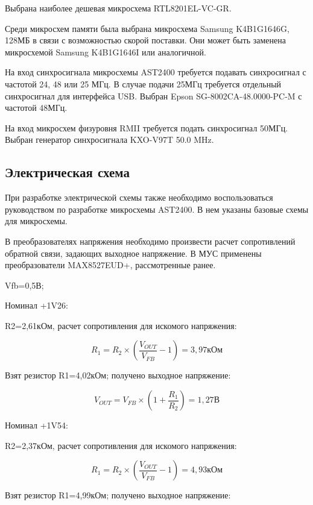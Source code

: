 Выбрана наиболее дешевая микросхема RTL8201EL-VC-GR. 

Среди микросхем памяти была выбрана микросхема Samsung K4B1G1646G, 128МБ в связи с возможностью скорой поставки. Они может быть заменена микросхемой Samsung K4B1G1646I или аналогичной.

На вход синхросигнала микросхемы AST2400 требуется подавать синхросигнал с частотой 24, 48 или 25 МГц. В случае подачи 25МГц требуется отдельный синхросигнал для интерфейса USB. Выбран Epson SG-8002CA-48.0000-PC-M с частотой 48МГц.

На вход микросхем физуровня RMII требуется подать синхросигнал 50МГц. Выбран генератор синхросигнала KXO-V97T 50.0 MHz.

\newpage
\subsection{Электрическая схема}

При разработке электрической схемы также необходимо воспользоваться руководством по разработке микросхемы AST2400. В нем указаны базовые схемы для микросхемы.

В преобразователях напряжения необходимо произвести расчет сопротивлений обратной связи, задающих выходное напряжение.
В МУС применены преобразователи MAX8527EUD+, рассмотренные ранее.

Vfb=0,5В; 

Номинал +1V26:

R2=2,61кОм, расчет сопротивления для искомого напряжения:

\begin{equation}
R_{1} = R_{2} \times \left(\frac{V_{OUT}}{V_{FB}} - 1 \right) = 3,97\text{кОм}
\end{equation}

Взят резистор R1=4,02кОм; получено выходное напряжение:

\begin{equation}
V_{OUT} = V_{FB} \times \left(1 + \frac{R_{1}}{R_{2}} \right) = 1,27\text{В}
\end{equation}


Номинал +1V54:

R2=2,37кОм, расчет сопротивления для искомого напряжения:

\begin{equation}
R_{1} = R_{2} \times \left(\frac{V_{OUT}}{V_{FB}} - 1 \right) = 4,93\text{кОм}
\end{equation}

Взят резистор R1=4,99кОм; получено выходное напряжение:

